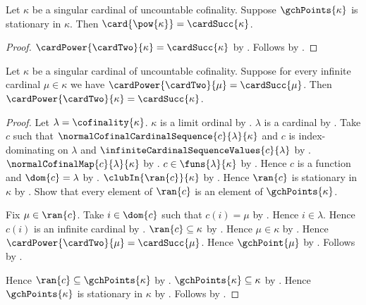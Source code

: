 \begin{corollary}\label{silver_theorem_stationary_powerset}
    Let $\kappa$ be a singular cardinal of uncountable cofinality.
    Suppose $\gchPoints{\kappa}$ is stationary in $\kappa$.
    Then $\card{\pow{\kappa}}=\cardSucc{\kappa}$.
\end{corollary}
\begin{proof}
    $\cardPower{\cardTwo}{\kappa}=\cardSucc{\kappa}$
        by .
    Follows by .
\end{proof}

\begin{corollary}\label{silver_theorem_from_gch_below}
    Let $\kappa$ be a singular cardinal of uncountable cofinality.
    Suppose for every infinite cardinal $\mu\in\kappa$ we have
        $\cardPower{\cardTwo}{\mu}=\cardSucc{\mu}$.
    Then $\cardPower{\cardTwo}{\kappa}=\cardSucc{\kappa}$.
\end{corollary}
\begin{proof}
    Let $\lambda=\cofinality{\kappa}$.
    $\kappa$ is a limit ordinal
        by .
    $\lambda$ is a cardinal by .
    Take $c$ such that
        $\normalCofinalCardinalSequence{c}{\lambda}{\kappa}$ and
        $c$ is index-dominating on $\lambda$ and
        $\infiniteCardinalSequenceValues{c}{\lambda}$
        by .
    $\normalCofinalMap{c}{\lambda}{\kappa}$
        by .
    $c\in\funs{\lambda}{\kappa}$ by .
    Hence $c$ is a function and $\dom{c}=\lambda$
        by .
    $\clubIn{\ran{c}}{\kappa}$
        by .
    Hence $\ran{c}$ is stationary in $\kappa$
        by .
    Show that every element of $\ran{c}$ is an element of
        $\gchPoints{\kappa}$.
    \begin{subproof}
        Fix $\mu\in\ran{c}$.
        Take $i\in\dom{c}$ such that $c(i)=\mu$
            by .
        Hence $i\in\lambda$.
        Hence $c(i)$ is an infinite cardinal
            by .
        $\ran{c}\subseteq\kappa$ by .
        Hence $\mu\in\kappa$ by .
        Hence $\cardPower{\cardTwo}{\mu}=\cardSucc{\mu}$.
        Hence $\gchPoint{\mu}$ by .
        Follows by .
    \end{subproof}
    Hence $\ran{c}\subseteq\gchPoints{\kappa}$ by .
    $\gchPoints{\kappa}\subseteq\kappa$
        by .
    Hence $\gchPoints{\kappa}$ is stationary in $\kappa$
        by .
    Follows by .
\end{proof}
